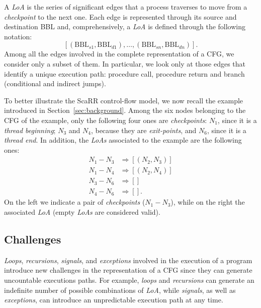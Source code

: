 A \emph{LoA} is the series of significant edges that a process traverses to 
move from a \emph{checkpoint} to the next one. Each edge is represented through 
its source and destination BBL and, comprehensively, a \emph{LoA} is defined 
through the following notation:
$$
[(\text{BBL}_{s1},\text{BBL}_{d1}), \dots, (\text{BBL}_{sn},\text{BBL}_{dn})].
$$
Among all the edges involved in the complete representation of a CFG, we 
consider only a subset of them.
In particular, we look only at those edges that identify a unique execution 
path: procedure call, procedure return and branch (\ie conditional and indirect 
jumps). 

To better illustrate the ScaRR control-flow model, we now recall the example 
introduced in Section~\ref{sec:background}. 
Among the six nodes belonging to the CFG of the example, only the following 
four ones are \emph{checkpoints}: $N_1$, since it is a \emph{thread beginning}; 
$N_3$ and $N_4$, because they are \emph{exit-points}, and $N_6$, since it is a 
\emph{thread end}. In addition, the \emph{LoAs} associated to the example are 
the following ones:  
\begin{equation*}
\begin{split}
N_1-N_3 &\Rightarrow [(N_2, N_3)] \\    
N_1-N_4 &\Rightarrow [(N_2, N_4)] \\ 
N_3-N_6 &\Rightarrow [] \\
N_4-N_6 &\Rightarrow [].
\end{split}
\end{equation*}
On the left we indicate a pair of \emph{checkpoints} (\eg $N_1-N_3$), while on 
the right the associated \emph{LoA} (empty \emph{LoAs} are considered valid).

\subsection{Challenges}
\label{ssec:challenges}
\emph{Loops}, \emph{recursions}, \emph{signals}, and \emph{exceptions} involved 
in the execution of a program introduce new challenges in the representation of 
a CFG since they can generate uncountable executions paths. For example, 
\emph{loops} and \emph{recursions} can generate an indefinite number of 
possible combinations of \emph{LoA}, while \emph{signals}, as well as 
\emph{exceptions}, can introduce an unpredictable execution path at any time.

